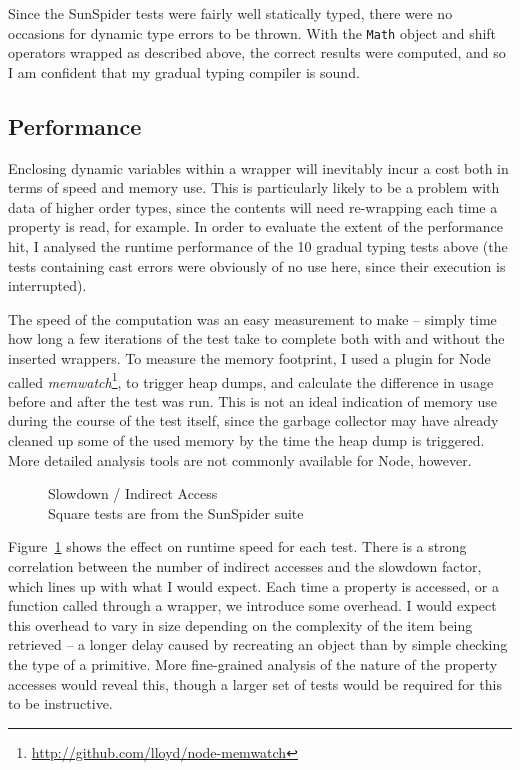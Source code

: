 \documentclass[12pt,a4paper,twoside,openright]{report}
\theoremstyle{definition}
\theoremstyle{dotless}
\newcommand*{\js}{\texttt}
\begin{document}
Since the SunSpider tests were fairly well statically typed, there were no
occasions for dynamic type errors to be thrown. With the \js{Math} object
and shift operators wrapped as described above, the correct results were
computed, and so I am confident that my gradual typing compiler is
sound.

\subsection*{Performance}

Enclosing dynamic variables within a wrapper will inevitably incur a cost both in
terms of speed and memory use. This is particularly likely to be a
problem with data of higher order types, since the contents will need
re-wrapping each time a property is read, for example. In order to evaluate the
extent of the performance hit, I analysed the runtime performance of the 10
gradual typing tests above (the tests containing cast errors were obviously
of no use here, since their execution is interrupted).

The speed of the computation was an easy measurement to make -- simply time how
long a few iterations of the test take to complete both with and without the
inserted wrappers. To measure the memory footprint, I used a plugin for Node
called \textit{memwatch}\footnote{\href{http://github.com/lloyd/node-memwatch}{http://github.com/lloyd/node-memwatch}},
to trigger heap dumps, and calculate the
difference in usage before and after the test was run. This is not an ideal
indication of memory use during the course of the test itself, since the
garbage collector may have already cleaned up some of the used memory by the
time the heap dump is triggered. More detailed analysis tools are not 
commonly available for Node, however.

\begin{figure}[H]
  \caption{Slowdown / Indirect Access \\ \footnotesize{Square tests are from the SunSpider suite}}
  \label{fig:slowdown}
\end{figure}

Figure~\ref{fig:slowdown} shows the effect on runtime speed for each test. 
There is a strong correlation between the number of indirect accesses
and the slowdown factor, which lines up with what I would expect. Each time a
property is accessed, or a function called through a wrapper, we 
introduce some overhead. I would expect this overhead to vary in size depending 
on the complexity of the item being retrieved -- a longer delay caused 
by recreating an object than by simple checking the type of a primitive. More fine-grained
analysis of the nature of the property accesses would reveal this, though a larger
set of tests would be required for this to be instructive.
\end{document}
